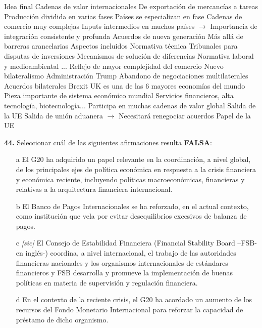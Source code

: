 \documentclass{nuevotema}
\begin{document}
\begin{esquemal}
		\2 Idea final
			\3 Cadenas de valor internacionales
				\4 De exportación de mercancías a tareas
				\4[] Producción dividida en varias fases
				\4[] Países se especializan en fase
				\4 Cadenas de comercio muy complejas
				\4[] Inputs intermedios en muchos países
				\4[] $\to$ Importancia de integración consistente y profunda
			\3 Acuerdos de nueva generación
				\4 Más allá de barreras arancelarias
				\4 Aspectos incluidos
				\4[] Normativa técnica
				\4[] Tribunales para disputas de inversiones
				\4[] Mecanismos de solución de diferencias
				\4[] Normativa laboral y medioambiental
				\4[] ...
				\4 Reflejo de mayor complejidad del comercio
			\3 Nuevo bilateralismo
				\4 Administración Trump
				\4 Abandono de negociaciones multilaterales
				\4 Acuerdos bilaterales
				\4
			\3 Brexit
				\4 UK es una de las 6 mayores economías del mundo
				\4[] Pieza importante de sistema económico mundial
				\4[] Servicios financieros, alta tecnología, biotecnología...
				\4[] Participa en muchas cadenas de valor global
				\4 Salida de la UE
				\4[] Salida de unión aduanera
				\4[] $\to$ Necesitará renegociar acuerdos
			\3 Papel de la UE
\end{esquemal}

























\preguntas

\textbf{44.} Seleccionar cuál de las siguientes afirmaciones resulta \textbf{FALSA}:
\begin{itemize}
	\item[a] El G20 ha adquirido un papel relevante en la coordinación, a nivel global, de los principales ejes de política económica en respuesta a la crisis financiera y económica reciente, incluyendo políticas macroeconómicas, financieras y relativas a la arquitectura financiera internacional.
	\item[b] El Banco de Pagos Internacionales se ha reforzado, en el actual contexto, como institución que vela por evitar desequilibrios excesivos de balanza de pagos.
	\item[c] \textit{[sic]} El Consejo de Estabilidad Financiera (Financial Stability Board --FSB- en inglés-) coordina, a nivel internacional, el trabajo de las autoridades financieras nacionales y los organismos internacionales de estándares financieros y FSB desarrolla y promueve la implementación de buenas políticas en materia de supervisión y regulación financiera.
	\item[d] En el contexto de la reciente crisis, el G20 ha acordado un aumento de los recursos del Fondo Monetario Internacional para reforzar la capacidad de préstamo de dicho organismo.
\end{itemize}
\end{document}
